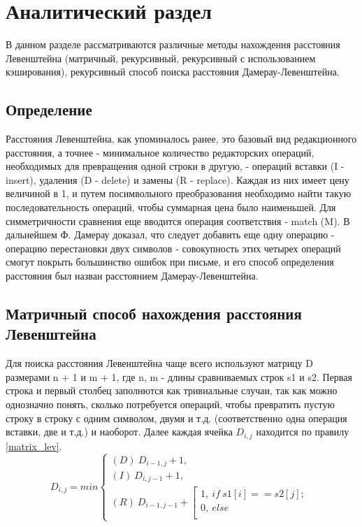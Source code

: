 \chapter{Аналитический раздел}
В данном разделе рассматриваются различные методы нахождения расстояния Левенштейна (матричный, рекурсивный, рекурсивный с использованием кэширования), рекурсивный способ поиска расстояния Дамерау-Левенштейна. 

\section{Определение}
Расстояния Левенштейна, как упоминалось ранее, это базовый вид редакционного расстояния, а точнее - минимальное количество редакторских операций, необходимых для превращения одной строки в другую, - операций вставки (I - insert), удаления (D - delete) и замены (R - replace). \cite{article_levenshtein} Каждая из них имеет цену величиной в 1, и путем посимвольного преобразования необходимо найти такую последовательность операций, чтобы суммарная цена было наименьшей. Для симметричности сравнения еще вводится операция соответствия - match (M). В дальнейшем Ф. Дамерау доказал, что следует добавить еще одну операцию - операцию перестановки двух символов - совокупность этих четырех операций смогут покрыть большинство ошибок при письме, и его способ определения расстояния был назван расстоянием Дамерау-Левенштейна.

\section{Матричный способ нахождения расстояния Левенштейна}
Для поиска расстояния Левенштейна чаще всего используют матрицу D размерами n + 1 и m + 1, где n, m - длины сравниваемых строк s1 и s2. Первая строка и первый столбец заполнются как тривиальные случаи, так как можно однозначно понять, сколько потребуется операций, чтобы превратить пустую строку в строку с одним символом, двумя и т.д. (соответственно одна операция вставки, две и т.д.) и наоборот. Далее каждая ячейка $D_{i,j}$ находится по  правилу \ref{matrix_lev}.
\begin{equation}
	\label{matrix_lev}
	D_{i,j} = min
	\begin{cases}
		(D)~D_{i-1,j} + 1, \\
		(I)~D_{i,j-1} + 1, \\
		(R)~D_{i-1,j-1} + 
		\left[
		\begin{gathered}
			1,~if~s1[i] == s2[j]; \\
			0,~else \\
		\end{gathered}
		\right.
	\end{cases}
\end{equation}

